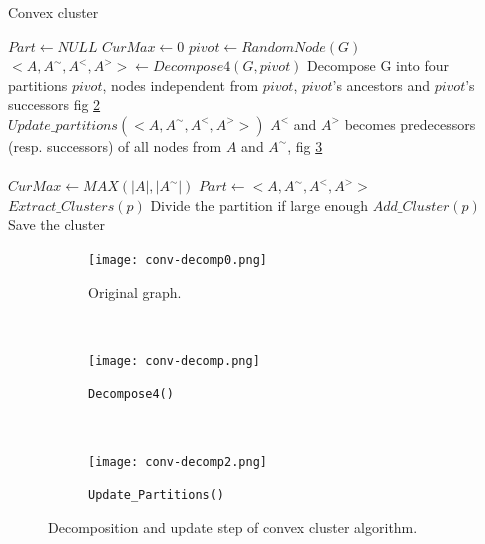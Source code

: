 \documentclass[10pt, conference, compsocconf,pdftex,dvipsnames]{IEEEtran}
\begin{document}
\begin{algorithm}[h!]
    \centering
    \caption{Convex cluster}
    \label{algo:conv-clust}
    \begin{algorithmic}[1]
        \State $Part \gets NULL$
        \State $CurMax \gets 0$
        \label{algop:main-loop}
        \State $pivot \gets RandomNode(G)$
        \State
        $<A,A^{\sim},A^<,A^>> \gets Decompose4(G,pivot)$\label{algop:init-part}
        \Comment Decompose G into four partitions 
        \Comment $pivot$, nodes independent from $pivot$, 
        \Comment $pivot$'s ancestors and $pivot$'s successors fig
        \ref{fig:conv-decomp1} 
        \\
        \State $Update\_partitions(<A,A^{\sim},A^<,A^>>)$
        \label{algop:update-part}
        \Comment $A^<$ and $A^>$ becomes predecessors 
        \Comment (resp. successors) of all nodes  
        \Comment from $A$ and $A^{\sim}$, fig 
        \ref{fig:conv-decomp2}
        \\
         \label{algop:part-choice}
        \\
        \State $CurMax \gets MAX(|A|,|A^{\sim}|)$
        \State $Part \gets <A,A^{\sim},A^<,A^>>$
        \EndIf
        \EndFor
        \label{algop:rec-stop}
        \State $Extract\_Clusters(p)$
        \Comment Divide the partition if large enough
        \Else
        \State $Add\_Cluster(p)$
        \Comment Save the cluster
        \EndIf
        \EndFor
        \EndFunction
    \end{algorithmic}
\end{algorithm}

\begin{figure}[t!]
    \centering
    \begin{subfigure}{0.24\textwidth}
        \centering
        \texttt{[image: conv-decomp0.png]}
        \caption{Original graph.}
        \label{fig:conv-decomp0}
    \end{subfigure}
    ~
    \begin{subfigure}{0.27\textwidth}
        \centering
        \texttt{[image: conv-decomp.png]}
        \caption{\texttt{Decompose4()}}
        \label{fig:conv-decomp1}
    \end{subfigure}
    ~
    \begin{subfigure}{0.27\textwidth}
        \centering
        \texttt{[image: conv-decomp2.png]}
        \caption{\texttt{Update\_Partitions()}}
        \label{fig:conv-decomp2}
    \end{subfigure}
    \caption{Decomposition and update step of convex cluster algorithm.}
    \label{fig:conv-decomp}
\end{figure}
\end{document}
